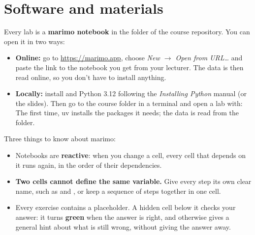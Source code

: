 \section{Software and materials}

Every lab is a \textbf{marimo notebook} in the  folder of the
course repository. You can open it in two ways:

\begin{itemize}
    \item \textbf{Online:} go to \url{https://marimo.app}, choose
        \emph{New $\rightarrow$ Open from URL\dots} and paste the link to
        the notebook you get from your lecturer. The data is then read
        online, so you don't have to install anything.
    \item \textbf{Locally:} install  and Python 3.12 following
        the \emph{Installing Python} manual (or the slides). Then go to the
        course folder in a terminal and open a lab with:\newline
        \newline The
        first time, uv installs the packages it needs; the data is read
        from the  folder.
\end{itemize}

Three things to know about marimo:

\begin{itemize}
  \item Notebooks are \textbf{reactive}: when you change a cell, every
        cell that depends on it runs again, in the order of their
        dependencies.
  \item \textbf{Two cells cannot define the same variable.} Give every
        step its own clear name, such as  and
        , or keep a sequence of steps together in one
        cell.
  \item Every exercise contains a  placeholder. A hidden cell
        below it checks your answer: it turns \textbf{green} when the
        answer is right, and otherwise gives a general hint about what is
        still wrong, without giving the answer away.
\end{itemize}
